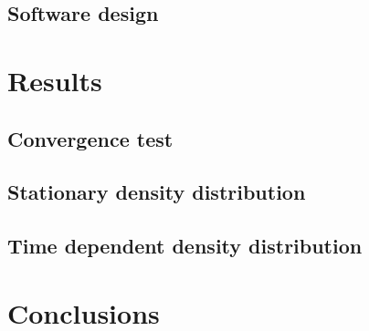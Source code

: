 \documentclass[a4paper,twoside,12pt]{article}
\begin{document}
\subsection{Software design}

\section{Results}

\subsection{Convergence test}

\subsection{Stationary density distribution}

\subsection{Time dependent density distribution}

\section{Conclusions}

\clearpage



\end{document}
